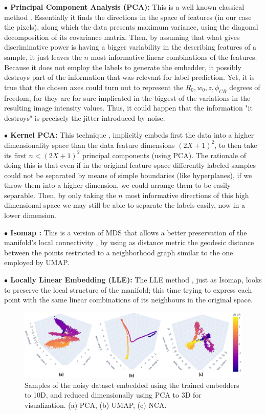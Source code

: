 \documentclass[11pt, a4paper, twoside]{article} %
\begin{document}
{\bf $\bullet$ Principal Component Analysis (PCA): }
This is a well known classical method  \cite{PCA}. Essentially it finds the directions in the space of features (in our case the pixels), along which the data presents maximum variance, using the diagonal decomposition of its covariance matrix. Then, by assuming that what gives discriminative power is having a bigger variability in the describing features of a sample, it just leaves the $n$ most informative linear combinations of the features. Because it does not employ the labels to generate the embedder, it possibly destroys part of the information that was relevant for label prediction. Yet, it is true that the chosen axes could turn out to represent the $R_0,w_0,z,\phi_{CR}$ degrees of freedom, for they are for sure implicated in the biggest of the variations in the resulting image intensity values. Thus, it could happen that the information "it destroys" is precisely the jitter introduced by noise.


{\bf $\bullet$ Kernel PCA: } This technique \cite{KPCA}, implicitly embeds first the data into a higher dimensionality space than the data feature dimensions $(2X+1)^2$, to then take its first $n<(2X+1)^2$ principal components (using PCA). The rationale of doing this is that even if in the original feature space differently labeled samples could not be separated by means of simple boundaries (like hyperplanes), if we throw them into a higher dimension, we could arrange them to be easily separable. Then, by only taking the $n$ most informative directions of this high dimensional space we may still be able to separate the labels easily, now in a lower dimension.


{\bf $\bullet$ Isomap :} This is a version of MDS that allows a better preservation of the manifold's local connectivity \cite{isomap}, by using as distance metric the geodesic distance between the points restricted to a neighborhood graph similar to the one employed by UMAP. 

{\bf $\bullet$ Locally Linear Embedding (LLE):} The LLE method \cite{LLE}, just as Isomap, looks to preserve the local structure of the manifold; this time trying to express each point with the same linear combinations of its neighbours in the original space.

 \begin{figure}[h!] 
     \centering 
    \includegraphics[width=0.96\linewidth]{emb1.PNG}
    \caption{ Samples of the noisy dataset embedded using the trained embedders to 10D, and reduced dimensionally using PCA to 3D for visualization. (a) PCA, (b) UMAP, (c) NCA.  }
    \label{fig:embeddings1}
\end{figure}
\end{document}
